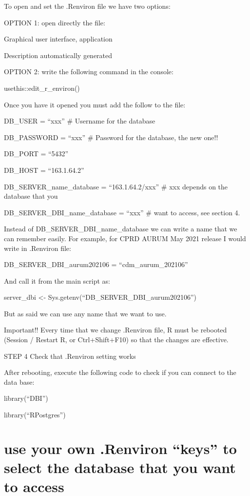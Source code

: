 \documentclass[
  letterpaper,
  DIV=11,
  numbers=noendperiod]{scrreprt}
\begin{document}
To open and set the .Renviron file we have two options:

OPTION 1: open directly the file:

Graphical user interface, application

Description automatically generated

OPTION 2: write the following command in the console:

usethis::edit\_r\_environ()

Once you have it opened you must add the follow to the file:

DB\_USER = ``xxx'' \# Username for the database

DB\_PASSWORD = ``xxx'' \# Password for the database, the new one!!

DB\_PORT = ``5432''

DB\_HOST = ``163.1.64.2''

DB\_SERVER\_name\_database = ``163.1.64.2/xxx'' \# xxx depends on the
database that you

DB\_SERVER\_DBI\_name\_database = ``xxx'' \# want to access, see section
4.

Instead of DB\_SERVER\_DBI\_name\_database we can write a name that we
can remember easily. For example, for CPRD AURUM May 2021 release I
would write in .Renviron file:

DB\_SERVER\_DBI\_aurum202106 = ``cdm\_aurum\_202106''

And call it from the main script as:

server\_dbi \textless- Sys.getenv(``DB\_SERVER\_DBI\_aurum202106'')

But as said we can use any name that we want to use.

Important!! Every time that we change .Renviron file, R must be rebooted
(Session / Restart R, or Ctrl+Shift+F10) so that the changes are
effective.

STEP 4 Check that .Renviron setting works

After rebooting, execute the following code to check if you can connect
to the data base:

library(``DBI'')

library(``RPostgres'')

\hypertarget{use-your-own-.renviron-keys-to-select-the-database-that-you-want-to-access}{%
\section{use your own .Renviron ``keys'' to select the database that you
want to
access}\label{use-your-own-.renviron-keys-to-select-the-database-that-you-want-to-access}}
\end{document}
